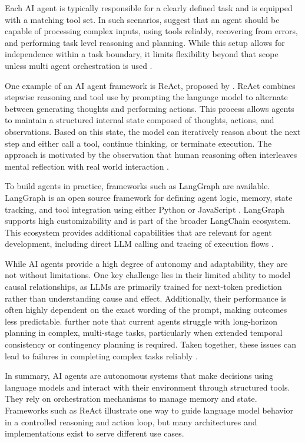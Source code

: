 \documentclass[a4paper,oneside,bibliography=totoc]{scrbook}
\begin{document}
Each \ac{AI} agent is typically responsible for a clearly defined task and is equipped with a matching tool set. In such scenarios, \citet{Anthropic2024} suggest that an agent should be capable of processing complex inputs, using tools reliably, recovering from errors, and performing task level reasoning and planning. While this setup allows for independence within a task boundary, it limits flexibility beyond that scope unless multi agent orchestration is used \cite{Sapkota2025}.

One example of an \ac{AI} agent framework is ReAct, proposed by \citet{Yao2023}. ReAct combines stepwise reasoning and tool use by prompting the language model to alternate between generating thoughts and performing actions. This process allows agents to maintain a structured internal state composed of thoughts, actions, and observations. Based on this state, the model can iteratively reason about the next step and either call a tool, continue thinking, or terminate execution. The approach is motivated by the observation that human reasoning often interleaves mental reflection with real world interaction \cite{Yao2023}.

To build agents in practice, frameworks such as LangGraph are available. LangGraph is an open source framework for defining agent logic, memory, state tracking, and tool integration using either Python or JavaScript \cite{LangChain2025}. LangGraph supports high customizability and is part of the broader LangChain ecosystem. This ecosystem provides additional capabilities that are relevant for agent development, including direct LLM calling and tracing of execution flows \cite{LangChain2025a}.

While \ac{AI} agents provide a high degree of autonomy and adaptability, they are not without limitations. One key challenge lies in their limited ability to model causal relationships, as \acp{LLM} are primarily trained for next-token prediction rather than understanding cause and effect. Additionally, their performance is often highly dependent on the exact wording of the prompt, making outcomes less predictable. \citet{Sapkota2025} further note that current agents struggle with long-horizon planning in complex, multi-stage tasks, particularly when extended temporal consistency or contingency planning is required. Taken together, these issues can lead to failures in completing complex tasks reliably \cite{Sapkota2025}.


In summary, \ac{AI} agents are autonomous systems that make decisions using language models and interact with their environment through structured tools. They rely on orchestration mechanisms to manage memory and state. Frameworks such as ReAct illustrate one way to guide language model behavior in a controlled reasoning and action loop, but many architectures and implementations exist to serve different use cases.
\end{document}
